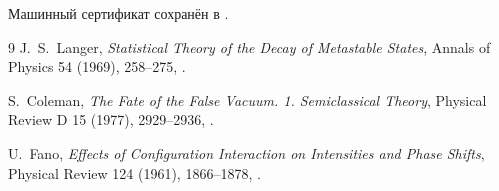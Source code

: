 Машинный сертификат сохранён в
.

\begin{thebibliography}{9}
J.~S.~Langer,
\emph{Statistical Theory of the Decay of Metastable States},
Annals of Physics 54 (1969), 258--275,
.

S.~Coleman,
\emph{The Fate of the False Vacuum. 1. Semiclassical Theory},
Physical Review D 15 (1977), 2929--2936,
.

U.~Fano,
\emph{Effects of Configuration Interaction on Intensities and Phase Shifts},
Physical Review 124 (1961), 1866--1878,
.
\end{thebibliography}